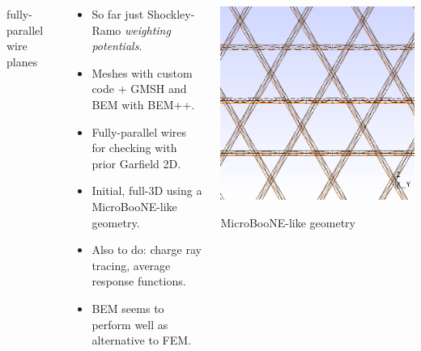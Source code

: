 \documentclass[xcolor=dvipsnames]{beamer}
\begin{document}
\begin{frame}
\begin{columns}
\begin{column}{0.15\textwidth}
      \tiny fully-parallel wire planes
    \end{column}
    \begin{column}{0.7\textwidth}
      \begin{itemize}\scriptsize
      \item So far just Shockley-Ramo \textit{weighting potentials}.
      \item Meshes with custom code + GMSH and BEM with BEM++.
      \item Fully-parallel wires for checking with prior Garfield 2D.
      \item Initial, full-3D using a MicroBooNE-like geometry.
      \item Also to do: charge ray tracing, average response functions.
      \item BEM seems to perform well as alternative to FEM.
      \end{itemize}
    \end{column}
    \begin{column}{0.15\textwidth}
      \includegraphics[width=\textwidth]{uboone-mesh.png}

      \tiny MicroBooNE-like geometry
    \end{column}
  \end{columns}


\end{frame}
\end{document}
